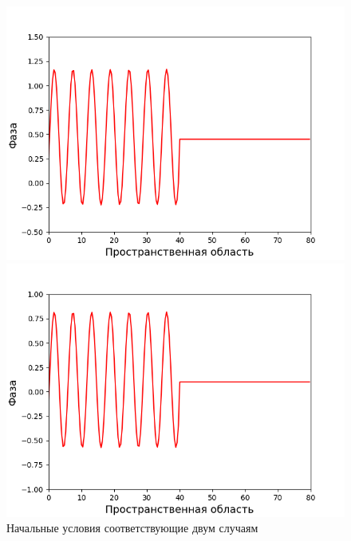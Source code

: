 \begin{figure}[p]
    \centering
    \begin{minipage}{0.49\linewidth}
        \includegraphics[width=\linewidth]{images/4-data_data_0.bin.png}
    \end{minipage}
    \hfill
    \begin{minipage}{0.49\linewidth}
        \includegraphics[width=\linewidth]{images/5-data_data_0.bin.png}
    \end{minipage}
    \caption{Начальные условия соответствующие двум случаям}
    \label{fig:begin_equation}


\end{figure}
